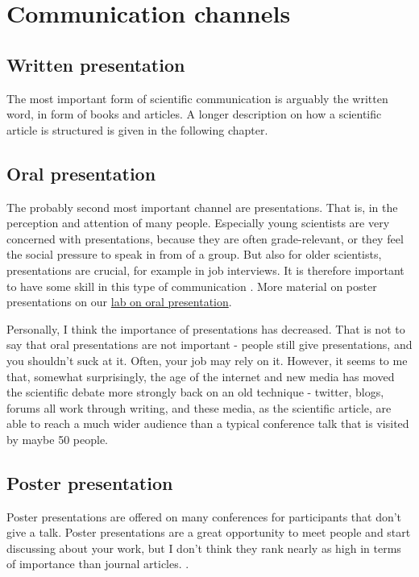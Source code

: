 \documentclass{tufte-book}
\begin{document}
\section{Communication channels}


\subsection{Written presentation}

The most important form of scientific communication is arguably the written word, in form of books and articles. A longer description on how a scientific article is structured is given in the following chapter. 

\subsection{Oral presentation}

The probably second most important channel are presentations. That is, in the perception and attention of many people. Especially young scientists are very concerned with presentations, because they are often grade-relevant, or they feel the social pressure to speak in from of a group. But also for older scientists, presentations are crucial, for example in job interviews. It is therefore important to have some skill in this type of communication \citep[see, e.g. the tips of][]{Kelleher-Tenguidelineseffective-2011}. More material on poster presentations on our \href{https://github.com/florianhartig/ResearchSkills/tree/master/Labs/OralPresentation}{lab on oral presentation}. 

Personally, I think the importance of presentations has decreased. That is not to say that oral presentations are not important - people still give presentations, and you shouldn't suck at it. Often, your job may rely on it. However, it seems to me that, somewhat surprisingly, the age of the internet and new media has moved the scientific debate more strongly back on an old technique - twitter, blogs, forums all work through writing, and these media, as the scientific article, are able to reach a much wider audience than a typical conference talk that is visited by maybe 50 people. 

\subsection{Poster presentation}

Poster presentations are offered on many conferences for participants that don't give a talk. Poster presentations are a great opportunity to meet people and start discussing about your work, but I don't think they rank nearly as high in terms of importance than journal articles. . 
\end{document}
